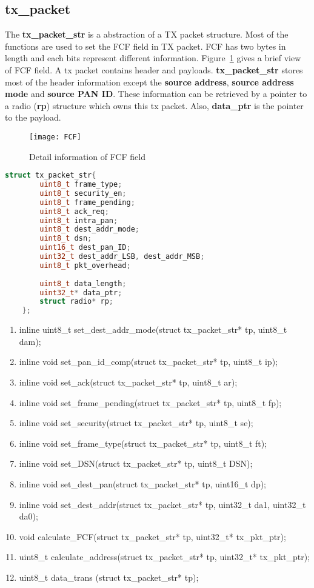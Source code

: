 \subsection{tx\_packet}
The {\bf tx\_packet\_str} is a abstraction of a TX packet structure. 
Most of the functions are used to set the FCF field in TX packet. FCF has two bytes in length
and each bits represent different information. Figure~\ref{fig:FCF} gives a brief view of FCF
field. A tx packet contains header and payloads. {\bf tx\_packet\_str } stores most of the header 
information except the {\bf source address}, {\bf source address mode} and {\bf source PAN ID}.
These information can be retrieved by a pointer to a radio ({\bf rp}) structure which owns this 
tx packet. Also, {\bf data\_ptr} is the pointer to the payload.
\begin{figure}[h]
	\centering
	\texttt{[image: FCF]}
	\caption{Detail information of FCF field}
	\label{fig:FCF}
\end{figure}

\begin{lstlisting}[language=c, caption=TX Packet Structure]
	struct tx_packet_str{
		uint8_t frame_type;
		uint8_t security_en;
		uint8_t frame_pending;
		uint8_t ack_req;
		uint8_t intra_pan;
		uint8_t dest_addr_mode;
		uint8_t dsn;
		uint16_t dest_pan_ID;
		uint32_t dest_addr_LSB, dest_addr_MSB;
		uint8_t pkt_overhead;
	
		uint8_t data_length;
		uint32_t* data_ptr;
		struct radio* rp;
	};
\end{lstlisting}

\begin{enumerate}
	\item inline uint8\_t set\_dest\_addr\_mode(struct tx\_packet\_str* tp, uint8\_t dam);
	\item inline void set\_pan\_id\_comp(struct tx\_packet\_str* tp, uint8\_t ip);
	\item inline void set\_ack(struct tx\_packet\_str* tp, uint8\_t ar);
	\item inline void set\_frame\_pending(struct tx\_packet\_str* tp, uint8\_t fp);
	\item inline void set\_security(struct tx\_packet\_str* tp, uint8\_t se);
	\item inline void set\_frame\_type(struct tx\_packet\_str* tp, uint8\_t ft);
	\item inline void set\_DSN(struct tx\_packet\_str* tp, uint8\_t DSN);
	\item inline void set\_dest\_pan(struct tx\_packet\_str* tp, uint16\_t dp);
	\item inline void set\_dest\_addr(struct tx\_packet\_str* tp, uint32\_t da1, uint32\_t da0);
	\item void calculate\_FCF(struct tx\_packet\_str* tp, uint32\_t* tx\_pkt\_ptr);
	\item uint8\_t calculate\_address(struct tx\_packet\_str* tp, uint32\_t* tx\_pkt\_ptr);
	\item uint8\_t data\_trans (struct tx\_packet\_str* tp);
\end{enumerate}

